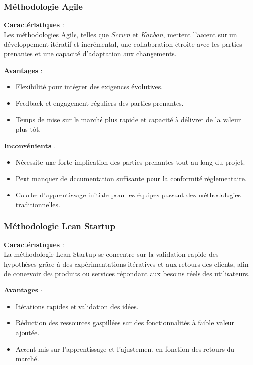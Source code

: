 \subsubsection*{Méthodologie Agile}
\textbf{Caractéristiques} :\\
Les méthodologies Agile, telles que \textit{Scrum} et \textit{Kanban}, mettent l'accent sur un développement itératif et incrémental, une collaboration étroite avec les parties prenantes et une capacité d'adaptation aux changements.

\textbf{Avantages} :
\begin{itemize}
    \item Flexibilité pour intégrer des exigences évolutives.
    \item Feedback et engagement réguliers des parties prenantes.
    \item Temps de mise sur le marché plus rapide et capacité à délivrer de la valeur plus tôt.
\end{itemize}

\textbf{Inconvénients} :
\begin{itemize}
    \item Nécessite une forte implication des parties prenantes tout au long du projet.
    \item Peut manquer de documentation suffisante pour la conformité réglementaire.
    \item Courbe d'apprentissage initiale pour les équipes passant des méthodologies traditionnelles.
\end{itemize}

\subsubsection*{Méthodologie Lean Startup}
\textbf{Caractéristiques} :\\
La méthodologie Lean Startup se concentre sur la validation rapide des hypothèses grâce à des expérimentations itératives et aux retours des clients, afin de concevoir des produits ou services répondant aux besoins réels des utilisateurs.

\textbf{Avantages} :
\begin{itemize}
    \item Itérations rapides et validation des idées.
    \item Réduction des ressources gaspillées sur des fonctionnalités à faible valeur ajoutée.
    \item Accent mis sur l'apprentissage et l’ajustement en fonction des retours du marché.
\end{itemize}

